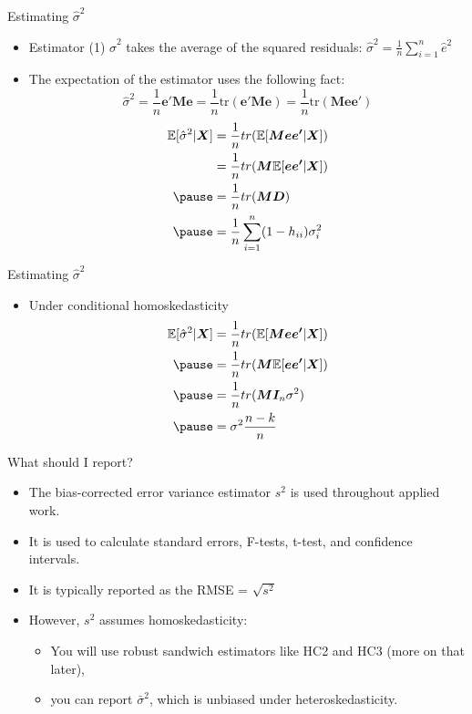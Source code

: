 \documentclass[aspectratio=169, handout]{beamer}
\numberwithin{equation}{section}
\begin{document}
\begin{frame}{Estimating $\hat{\sigma}^2$}
\begin{itemize}
\item Estimator (1) $\hat{\sigma}^2$ takes the average of the squared residuals: $\hat{\sigma}^2=\frac{1}{n}\sum_{i=1}^n \hat{e}^2$

\item The expectation of the estimator uses the following fact:
$$\hat{\sigma}^2=\frac{1}{n}\bm{e'}\bm{M}\bm{e}=\frac{1}{n}\text{tr}(\bm{e'}\bm{M}\bm{e})=\frac{1}{n}\text{tr}(\bm{Mee'})$$
\begin{align*}
\mathbb{E}[\hat{\sigma}^2|\bm{X}]&=\frac{1}{n}tr(\mathbb{E}[\bm{Mee'}|\bm{X}])\\
&=\frac{1}{n}tr(\bm{M}\mathbb{E}[\bm{ee'}|\bm{X}])\\ \pause
&=\frac{1}{n}tr(\bm{M}\bm{D})\\\pause
&=\frac{1}{n}\sum_{i=1}^n(1-h_{ii})\sigma^2_i
\end{align*}
\end{itemize}
\end{frame}  

\begin{frame}{Estimating $\hat{\sigma}^2$}
\begin{itemize}
\item Under conditional homoskedasticity
\begin{align*}
\mathbb{E}[\hat{\sigma}^2|\bm{X}]&=\frac{1}{n}tr(\mathbb{E}[\bm{Mee'}|\bm{X}])\\\pause
&=\frac{1}{n}tr(\bm{M}\mathbb{E}[\bm{ee'}|\bm{X}])\\\pause
&=\frac{1}{n}tr(\bm{M}\bm{I}_n\sigma^2)\\\pause
&=\sigma^2\frac{n-k}{n}
\end{align*}
\end{itemize}
\end{frame}
 
\begin{frame}{What should I report?}
\begin{itemize}
\item The bias-corrected error variance estimator $s^2$ is used throughout applied work.
\item It is used to calculate standard errors, F-tests, t-test, and confidence intervals.
\item It is typically reported as the RMSE = $\sqrt{s^2}$
\item However, $s^2$ assumes homoskedasticity:
\begin{itemize}
\item You will use robust sandwich estimators like HC2 and HC3 (more on that later),
\item you can report $\bar{\sigma}^2$, which is unbiased under heteroskedasticity.
\end{itemize}
\end{itemize}
\end{frame}
 
 
\end{document}
